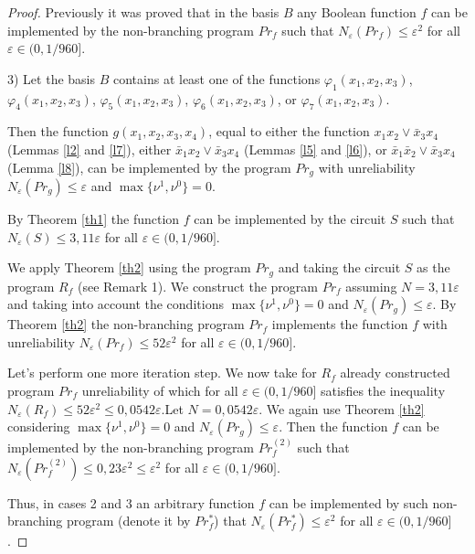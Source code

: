 \documentclass[
11pt,%
tightenlines,%
twoside,%
onecolumn,%
nofloats,%
nobibnotes,%
nofootinbib,%
superscriptaddress,%
noshowpacs,%
centertags]%
{revtex4}
\begin{document}
\begin{proof}
Previously \cite{18} it was proved that in the basis $B$ any
Boolean function $f$ can be implemented by the non-branching program
$Pr_f$ such that $N_\varepsilon (Pr_f) \leq\varepsilon^2$ for all
$\varepsilon\in(0, 1/960]$.

3) Let the basis $B$ contains at least one of the functions
$\varphi_1(x_1, x_2, x_3)$, $\varphi_4(x_1, x_2, x_3)$,
$\varphi_5(x_1, x_2, x_3)$, $\varphi_6(x_1, x_2, x_3)$, or
$\varphi_7(x_1, x_2, x_3)$.

Then the function $g (x_1, x_2, x_3, x_4)$, equal to  either the
function $x_1x_2\vee \bar{x}_3x_4$  (Lemmas \ref{l2} and \ref{l7}),
either $\bar{x}_1x_2\vee \bar{x}_3x_4$  (Lemmas \ref{l5} and
\ref{l6}), or $\bar{x}_1\bar{x}_2\vee \bar{x}_3x_4$  (Lemma
\ref{l8}), can be implemented by the program $Pr_g$ with
unreliability $N_\varepsilon (Pr_g) \leq \varepsilon$ and
$\max\{\nu^1, \nu^0\}=0$.

By Theorem \ref{th1} the function $f$ can be implemented  by the
circuit $S$ such that $N_\varepsilon (S) \leq3,11\varepsilon$
\linebreak for all $\varepsilon\in(0, 1/960]$.

We apply Theorem \ref{th2} using the program $Pr_g$ and taking  the
circuit $S$ as the program $R_f$ \linebreak (see Remark 1). We
construct the program $Pr_f$ assuming $N = 3,11\varepsilon$ and
taking into account the conditions $\max\{\nu^1, \nu^0\}=0$ and
$N_\varepsilon (Pr_g) \leq \varepsilon$. By Theorem \ref{th2} the
non-branching program $Pr_f$ implements the function $f$ with
unreliability $N_\varepsilon (Pr_f) \leq52\varepsilon^2$ for all
$\varepsilon\in(0, 1/960]$.

Let's perform one more iteration step. We now take for $R_f$ already
constructed program $Pr_f$ unreliability of which for all
$\varepsilon\in(0, 1/960]$ satisfies the inequality $N_\varepsilon
(R_f) \leq52\varepsilon^2\leq0,0542\varepsilon$.\linebreak Let $N =
0,0542\varepsilon$. We again use Theorem \ref{th2} considering
$\max\{\nu^1, \nu^0\}=0$ and $N_\varepsilon (Pr_g) \leq\varepsilon$.
\linebreak Then the function $f$ can be implemented by the
non-branching program $Pr_f^{(2)}$ such that \linebreak
$N_\varepsilon (Pr_f^{(2)}) \leq0,23\varepsilon^2\leq \varepsilon^2$
for all $\varepsilon\in(0, 1/960]$.

Thus, in cases 2 and 3 an arbitrary function $f$ can be implemented
by such non-branching program (denote it by $Pr_f^*$) that
$N_\varepsilon (Pr_f^*) \leq \varepsilon^2$ for all
$\varepsilon\in(0, 1/960]$.


\end{proof}
\end{document}
